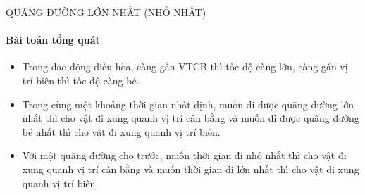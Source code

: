 \begin{dang}{QUÃNG ĐƯỜNG LỚN NHẤT (NHỎ NHẤT)}
\setcounter{paragraph}{0}
\paragraph{Bài toán tổng quát}
\begin{itemize}
\item Trong dao động điều hòa, càng gần VTCB thì tốc độ càng lớn, càng gần vị trí biên thì tốc độ càng bé. 
\item Trong cùng một khoảng thời gian nhất định, muốn đi được quãng đường lớn nhất thì cho vật đi xung quanh vị trí cân bằng và muốn đi được quãng đường bé nhất thì cho vật đi xung quanh vị trí biên.
\item Với một quãng đường cho trước, muốn thời gian đi nhỏ nhất thì cho vật đi xung quanh vị trí cân bằng và muốn thời gian đi lớn nhất thì cho vật đi xung quanh vị trí biên.
\end{itemize}

\end{dang}
